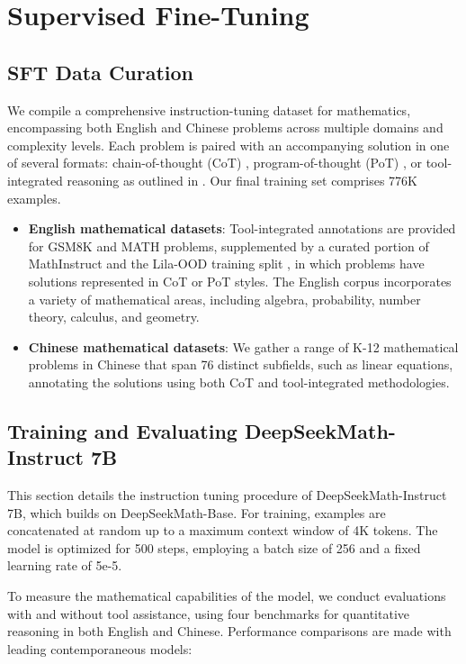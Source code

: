 \section{Supervised Fine-Tuning}

\subsection{SFT Data Curation}

We compile a comprehensive instruction-tuning dataset for mathematics, encompassing both English and Chinese problems across multiple domains and complexity levels. Each problem is paired with an accompanying solution in one of several formats: chain-of-thought (CoT) \citep{cot}, program-of-thought (PoT) \citep{pot,pal}, or tool-integrated reasoning as outlined in \citep{tora}. Our final training set comprises 776K examples.

\begin{itemize}[topsep=0pt]
    \item \textbf{English mathematical datasets}: Tool-integrated annotations are provided for GSM8K and MATH problems, supplemented by a curated portion of MathInstruct \citep{MathInstruct} and the Lila-OOD training split \citep{lila}, in which problems have solutions represented in CoT or PoT styles. The English corpus incorporates a variety of mathematical areas, including algebra, probability, number theory, calculus, and geometry.
    \item \textbf{Chinese mathematical datasets}: We gather a range of K-12 mathematical problems in Chinese that span 76 distinct subfields, such as linear equations, annotating the solutions using both CoT and tool-integrated methodologies.
\end{itemize}

\subsection{Training and Evaluating DeepSeekMath-Instruct 7B}

This section details the instruction tuning procedure of DeepSeekMath-Instruct 7B, which builds on DeepSeekMath-Base. For training, examples are concatenated at random up to a maximum context window of 4K tokens. The model is optimized for 500 steps, employing a batch size of 256 and a fixed learning rate of 5e-5.

To measure the mathematical capabilities of the model, we conduct evaluations with and without tool assistance, using four benchmarks for quantitative reasoning in both English and Chinese. Performance comparisons are made with leading contemporaneous models:

